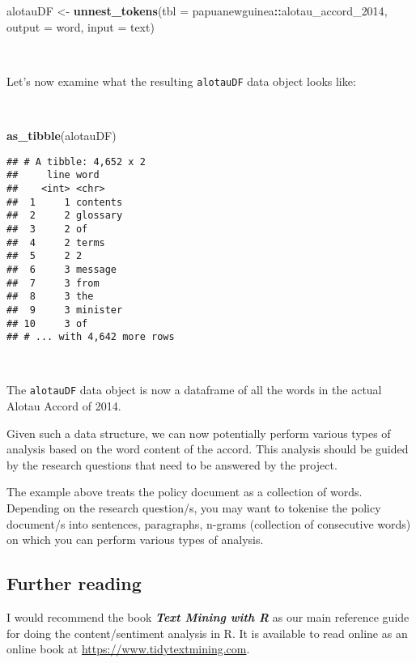 \documentclass[11pt,a4paper]{article}
\newenvironment{Shaded}{\begin{snugshade}}{\end{snugshade}}
\newcommand{\KeywordTok}[1]{\textcolor[rgb]{0.13,0.29,0.53}{\textbf{#1}}}
\newcommand{\DataTypeTok}[1]{\textcolor[rgb]{0.13,0.29,0.53}{#1}}
\newcommand{\DecValTok}[1]{\textcolor[rgb]{0.00,0.00,0.81}{#1}}
\newcommand{\StringTok}[1]{\textcolor[rgb]{0.31,0.60,0.02}{#1}}
\newcommand{\OperatorTok}[1]{\textcolor[rgb]{0.81,0.36,0.00}{\textbf{#1}}}
\newcommand{\NormalTok}[1]{#1}
\begin{document}
\begin{Shaded}
\begin{Highlighting}[]
\NormalTok{alotauDF <-}\StringTok{ }\KeywordTok{unnest_tokens}\NormalTok{(}\DataTypeTok{tbl =}\NormalTok{ papuanewguinea}\OperatorTok{::}\NormalTok{alotau_accord_}\DecValTok{2014}\NormalTok{,}
                          \DataTypeTok{output =}\NormalTok{ word, }
                          \DataTypeTok{input =}\NormalTok{ text)}
\end{Highlighting}
\end{Shaded}

~

Let's now examine what the resulting \texttt{alotauDF} data object looks
like:

~

\begin{Shaded}
\begin{Highlighting}[]
\KeywordTok{as_tibble}\NormalTok{(alotauDF)}
\end{Highlighting}
\end{Shaded}

\begin{verbatim}
## # A tibble: 4,652 x 2
##     line word    
##    <int> <chr>   
##  1     1 contents
##  2     2 glossary
##  3     2 of      
##  4     2 terms   
##  5     2 2       
##  6     3 message 
##  7     3 from    
##  8     3 the     
##  9     3 minister
## 10     3 of      
## # ... with 4,642 more rows
\end{verbatim}

~

The \texttt{alotauDF} data object is now a dataframe of all the words in
the actual Alotau Accord of 2014.

Given such a data structure, we can now potentially perform various
types of analysis based on the word content of the accord. This analysis
should be guided by the research questions that need to be answered by
the project.

The example above treats the policy document as a collection of words.
Depending on the research question/s, you may want to tokenise the
policy document/s into sentences, paragraphs, n-grams (collection of
consecutive words) on which you can perform various types of analysis.

\hypertarget{further-reading}{%
\subsection{Further reading}\label{further-reading}}

I would recommend the book \textbf{\emph{Text Mining with R}} as our
main reference guide for doing the content/sentiment analysis in R. It
is available to read online as an online book at
\url{https://www.tidytextmining.com}.
\end{document}
